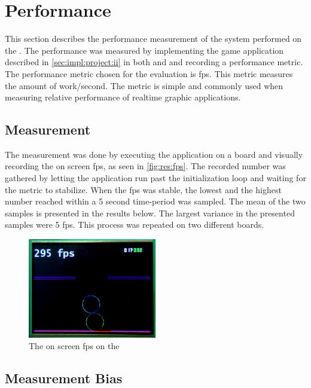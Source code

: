 
\section{Performance}
\label{sec:res:perf}

This section describes the performance measurement of the system performed on the {\DK}.
The performance was measured by implementing the game application described in \autoref{sec:impl:project:ii} in both {\C} and {\rust} and recording a performance metric.
The performance metric chosen for the evaluation is \gls{fps}.
This metric measures the amount of work/second.
The metric is simple and commonly used when measuring relative performance of realtime graphic applications.

\subsection{Measurement}
The measurement was done by executing the application on a {\DK} board and visually recording the on screen \gls{fps}, as seen in \autoref{fig:res:fps}.
The recorded number was gathered by letting the application run past the initialization loop and waiting for the metric to stabilize.
When the \gls{fps} was stable, the lowest and the highest number reached within a 5 second time-period was sampled.
The mean of the two samples is presented in the results below.
The largest variance in the presented samples were 5 \gls{fps}.
This process was repeated on two different {\DK} boards.

\begin{figure}[H]
  \begin{center}
    \includegraphics[width=0.5\textwidth]{figures/game-fps}
  \end{center}
  \caption{The on screen \gls{fps} on the {\DK}}
  \label{fig:res:fps}
\end{figure}


\subsection{Measurement Bias}
\label{sec:perf:bias}

